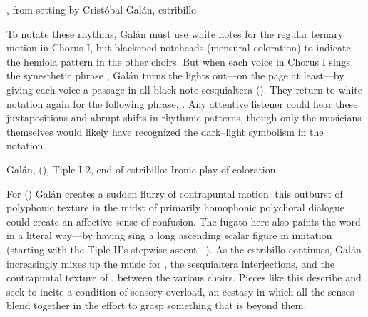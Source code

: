 
{, from setting by Cristóbal Galán, estribillo}

To notate these rhythms, Galán must use white notes for the regular ternary
motion in Chorus I, but blackened noteheads (mensural coloration) to indicate
the hemiola pattern in the other choirs.
But when each voice in Chorus I sings the synesthetic phrase , Galán turns the lights out---on the page at least---by
giving each voice a passage in all black-note sesquialtera
().
They return to white notation again for the following phrase, .
Any attentive listener could hear these juxtapositions and abrupt shifts in
rhythmic patterns, though only the musicians themselves would likely have
recognized the dark--light symbolism in the notation.%
    \Autocite[36]{Kendrick:Jeremiah}


{Galán,  (), Tiple I-2,
end of estribillo: Ironic play of coloration}

For  () Galán creates a
sudden flurry of contrapuntal motion: this outburst of polyphonic texture in
the midst of primarily homophonic polychoral dialogue could create an affective
sense of confusion.
The fugato here also paints the word  in a literal way---by
having  sing a long ascending scalar figure in imitation
(starting with the Tiple II's stepwise ascent --).
As the estribillo continues, Galán increasingly mixes up the music for
, the sesquialtera interjections, and the contrapuntal
texture of , between the various choirs.
Pieces like this describe and seek to incite a condition of sensory overload, an
ecstasy in which all the senses blend together in the effort to grasp something
that is beyond them.

